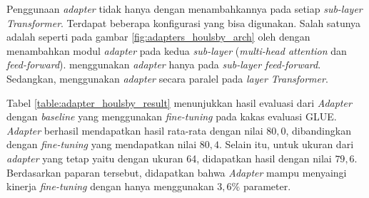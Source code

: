 Penggunaan \textit{adapter} tidak hanya dengan menambahkannya pada setiap \textit{sub-layer Transformer}. Terdapat beberapa konfigurasi yang bisa digunakan. Salah satunya adalah seperti pada gambar \ref{fig:adapters_houlsby_arch} oleh \parencite{adapter_houlsby} dengan menambahkan modul \textit{adapter} pada kedua \textit{sub-layer} (\textit{multi-head attention} dan \textit{feed-forward}). \citeauthor{adapter_pfeiffer} menggunakan \textit{adapter} hanya pada \textit{sub-layer feed-forward}. Sedangkan, \citeauthor{uvpl} menggunakan \textit{adapter} secara paralel pada \textit{layer Transformer}.

\begin{table}[h]
    \vspace{0.25cm}
    \centering
    \caption{Hasil evaluasi \textit{Adapter} konfigurasi \citeauthor{adapter_houlsby} pada GLUE \parencite{adapter_houlsby}}
    \label{table:adapter_houlsby_result}
\end{table}

Tabel \ref{table:adapter_houlsby_result} menunjukkan hasil evaluasi dari \textit{Adapter} dengan \textit{baseline} yang menggunakan \textit{fine-tuning} pada kakas evaluasi GLUE. \textit{Adapter} berhasil mendapatkan hasil rata-rata dengan nilai $80,0$, dibandingkan dengan \textit{fine-tuning} yang mendapatkan nilai $80,4$. Selain itu, untuk ukuran dari \textit{adapter} yang tetap yaitu dengan ukuran 64, didapatkan hasil dengan nilai $79,6$. Berdasarkan paparan tersebut, didapatkan bahwa \textit{Adapter} mampu menyaingi kinerja \textit{fine-tuning} dengan hanya menggunakan $3,6\%$ parameter. 

